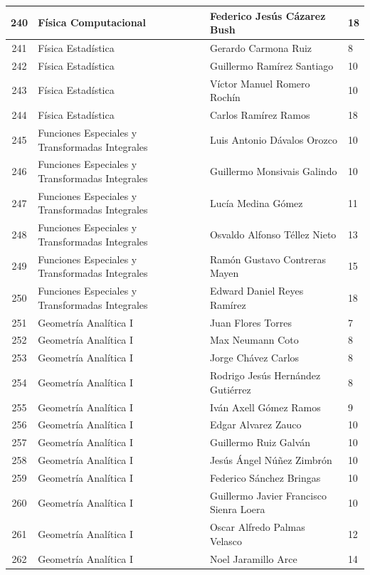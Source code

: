 {\begin{longtable}{|c|p{6.5cm}|p{5cm}|p{1.5cm}|}
240 & Física Computacional & Federico Jesús Cázarez Bush & 18 \\ \hline
241 & Física Estadística & Gerardo Carmona Ruiz & 8 \\ \hline
242 & Física Estadística & Guillermo Ramírez Santiago & 10 \\ \hline
243 & Física Estadística & Víctor Manuel Romero Rochín & 10 \\ \hline
244 & Física Estadística & Carlos Ramírez Ramos & 18 \\ \hline
245 & Funciones Especiales y Transformadas Integrales & Luis Antonio Dávalos Orozco & 10 \\ \hline
246 & Funciones Especiales y Transformadas Integrales & Guillermo Monsivais Galindo & 10 \\ \hline
247 & Funciones Especiales y Transformadas Integrales & Lucía Medina Gómez & 11 \\ \hline
248 & Funciones Especiales y Transformadas Integrales & Osvaldo Alfonso Téllez Nieto & 13 \\ \hline
249 & Funciones Especiales y Transformadas Integrales & Ramón Gustavo Contreras Mayen & 15 \\ \hline
250 & Funciones Especiales y Transformadas Integrales & Edward Daniel Reyes Ramírez & 18 \\ \hline
251 & Geometría Analítica I & Juan Flores Torres & 7 \\ \hline
252 & Geometría Analítica I & Max Neumann Coto & 8 \\ \hline
253 & Geometría Analítica I & Jorge Chávez Carlos & 8 \\ \hline
254 & Geometría Analítica I & Rodrigo Jesús Hernández Gutiérrez & 8 \\ \hline
255 & Geometría Analítica I & Iván Axell Gómez Ramos & 9 \\ \hline
256 & Geometría Analítica I & Edgar Alvarez Zauco & 10 \\ \hline
257 & Geometría Analítica I & Guillermo Ruiz Galván & 10 \\ \hline
258 & Geometría Analítica I & Jesús Ángel Núñez Zimbrón & 10 \\ \hline
259 & Geometría Analítica I & Federico Sánchez Bringas & 10 \\ \hline
260 & Geometría Analítica I & Guillermo Javier Francisco Sienra Loera & 10 \\ \hline
261 & Geometría Analítica I & Oscar Alfredo Palmas Velasco & 12 \\ \hline
262 & Geometría Analítica I & Noel Jaramillo Arce & 14 \\ \hline

\end{longtable}}
